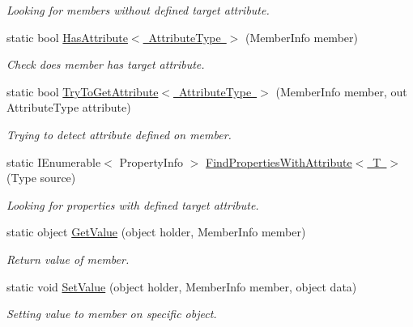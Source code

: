 \begin{DoxyCompactItemize}
\begin{DoxyCompactList}\small\item\em Looking for members without defined target attribute. \end{DoxyCompactList}\item 
static bool \mbox{\hyperlink{class_uniform_data_operator_1_1_assemblies_management_1_1_members_handler_a4b9cd91b2f9c5f8871e71ff70912ff8d}{Has\+Attribute$<$ Attribute\+Type $>$}} (Member\+Info member)
\begin{DoxyCompactList}\small\item\em Check does member has target attribute. \end{DoxyCompactList}\item 
static bool \mbox{\hyperlink{class_uniform_data_operator_1_1_assemblies_management_1_1_members_handler_ab99b085c361e2edc003149ea57203f93}{Try\+To\+Get\+Attribute$<$ Attribute\+Type $>$}} (Member\+Info member, out Attribute\+Type attribute)
\begin{DoxyCompactList}\small\item\em Trying to detect attribute defined on member. \end{DoxyCompactList}\item 
static I\+Enumerable$<$ Property\+Info $>$ \mbox{\hyperlink{class_uniform_data_operator_1_1_assemblies_management_1_1_members_handler_af18869106319a1b9b0473a817a3c1964}{Find\+Properties\+With\+Attribute$<$ T $>$}} (Type source)
\begin{DoxyCompactList}\small\item\em Looking for properties with defined target attribute. \end{DoxyCompactList}\item 
static object \mbox{\hyperlink{class_uniform_data_operator_1_1_assemblies_management_1_1_members_handler_a6cc89d5d7bbec4fe48b7f698ead2667f}{Get\+Value}} (object holder, Member\+Info member)
\begin{DoxyCompactList}\small\item\em Return value of member. \end{DoxyCompactList}\item 
static void \mbox{\hyperlink{class_uniform_data_operator_1_1_assemblies_management_1_1_members_handler_a78639bd006a0e62b40abc26043f63c5b}{Set\+Value}} (object holder, Member\+Info member, object data)
\begin{DoxyCompactList}\small\item\em Setting value to member on specific object. \end{DoxyCompactList}\item 

\end{DoxyCompactItemize}
